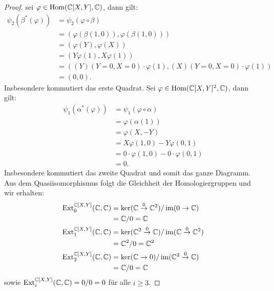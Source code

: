 \documentclass{nico_zettelsose21}
\newcommand{\Ext}{\operatorname{Ext}}
\renewcommand{\im}{\operatorname{im}}
\begin{document}
\begin{enumerate}[(a)]
\begin{proof}
                sei $\varphi \in \operatorname{Hom}(\mathbb{C}[X,Y],\mathbb{C})$, dann gilt:
                \begin{align*}
                    \psi_{2}(\beta^{*}(\varphi)) &= \psi_{2}(\varphi \circ \beta) \\
                    &= (\varphi(\beta(1,0)),\varphi(\beta(1,0))) \\
                    &= (\varphi(Y),\varphi(X)) \\
                    &= (Y\varphi(1),X\varphi(1)) \\
                    &= ((Y)(Y = 0, X = 0) \cdot \varphi(1),(X)(Y = 0, X = 0) \cdot \varphi(1)) \\
                    &= (0,0).
                \end{align*}
                Insbesondere kommutiert das erste Quadrat. Sei $\varphi \in \operatorname{Hom}(\mathbb{C}[X,Y]^{2},\mathbb{C})$, dann gilt:
                \begin{align*}
                    \psi_{1}(\alpha^{*}(\varphi)) &= \psi_{1}(\varphi \circ \alpha) \\
                    &= \varphi(\alpha(1)) \\
                    &= \varphi(X,-Y) \\
                    &= X\varphi(1,0) - Y\varphi(0,1) \\
                    &= 0 \cdot \varphi(1,0) - 0 \cdot \varphi(0,1) \\
                    &= 0.
                \end{align*}
                Insbesondere kommutiert das zweite Quadrat und somit das ganze Diagramm. Aus dem Quasiisomorphismus folgt die Gleichheit 
                der Homologiergruppen und wir erhalten:
                \begin{align*}
                    \Ext_{0}^{\C[X,Y]}(\C,\C) &= \ker(\C \stackrel{0}{\rightarrow} \C^{2})/\im(0 \to \C) \\
                    &= \C/0 = \C \\
                    \Ext_{1}^{\C[X,Y]}(\C,\C) &= \ker(\C^{2} \stackrel{0}{\rightarrow} \C)/\im(\C \stackrel{0}{\rightarrow} \C^{2}) \\
                    &= \C^{2}/0 = \C^{2} \\
                    \Ext_{2}^{\C[X,Y]}(\C,\C) &= \ker(\C \to 0)/\im(\C^{2} \stackrel{0}{\rightarrow} \C) \\
                    &= \C/0 = \C
                \end{align*}
                sowie $\Ext_{i}^{\C[X,Y]}(\C,\C) = 0/0 = 0$ für alle $i \geq 3$. 
            \end{proof}
\end{enumerate}
\end{document}
